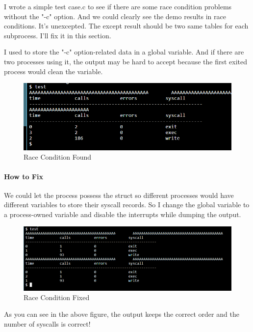 \documentclass[11pt,oneside,a4paper]{article}
\begin{document}
I wrote a simple test case.c to see if there are some race condition problems without the "-c" option. And we 
could clearly see the demo results in race conditions. It's unexcepted. The except result should be 
two same tables for each subprocess. I'll fix it in this section.

I used to store the "-c" option-related data in a global variable. And if there are two processes using it,
the output may be hard to accept because the first exited process would clean the variable. 

\begin{figure}[H]
    \includegraphics[width=4.75in]{1-41.png}
    \centering
    \caption{Race Condition Found}
\end{figure}

\paragraph*{How to Fix} 
We could let the process possess the struct so different processes would have different variables to store 
their syscall records. So I change the global variable to a process-owned variable and disable the interrupts
while dumping the output. 

\begin{figure}[H]
    \includegraphics[width=4.75in]{1-42.png}
    \centering
    \caption{Race Condition Fixed}
\end{figure}

As you can see in the above figure, the output keeps the correct order and the number of syscalls is correct!
\end{document}
